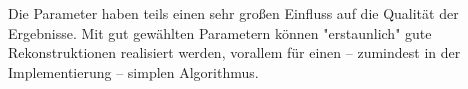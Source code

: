 \documentclass[german,notitlepage,smartquotes]{hgbreport}
\begin{document}
Die Parameter haben teils einen sehr großen Einfluss auf die Qualität der Ergebnisse. Mit gut gewählten Parametern können "erstaunlich" gute Rekonstruktionen realisiert werden, vorallem für einen -- zumindest in der Implementierung -- simplen Algorithmus.








\end{document}
